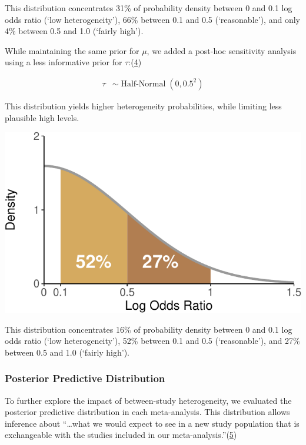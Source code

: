 \documentclass[
  12pt,
]{article}
\begin{document}
This distribution concentrates 31\% of probability density between 0 and
0.1 log odds ratio (`low heterogeneity'), 66\% between 0.1 and 0.5
(`reasonable'), and only 4\% between 0.5 and 1.0 (`fairly high').

\newpage

While maintaining the same prior for \(\mu\), we added a post-hoc
sensitivity analysis using a less informative prior for
\(\tau\):(\protect\hyperlink{ref-rover2021}{4})

\begin{align*}
\tau & \sim \operatorname{Half-Normal}(0, 0.5^2)
\end{align*}

This distribution yields higher heterogeneity probabilities, while
limiting less plausible high levels.

\begin{center}\includegraphics{supplementary_material_files/figure-latex/weakly tau prior visualization-1} \end{center}

This distribution concentrates 16\% of probability density between 0 and
0.1 log odds ratio (`low heterogeneity'), 52\% between 0.1 and 0.5
(`reasonable'), and 27\% between 0.5 and 1.0 (`fairly high').

\hypertarget{posterior-predictive-distribution}{%
\subsubsection{Posterior Predictive
Distribution}\label{posterior-predictive-distribution}}

To further explore the impact of between-study heterogeneity, we
evaluated the posterior predictive distribution in each meta-analysis.
This distribution allows inference about ``\ldots what we would expect
to see in a new study population that is exchangeable with the studies
included in our meta-analysis.''(\protect\hyperlink{ref-welton2020}{5})
\end{document}
